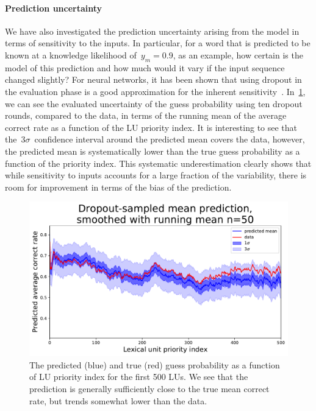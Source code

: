 \paragraph{Prediction uncertainty}
We have also investigated the prediction uncertainty arising from the model in terms of sensitivity to the inputs. In particular, for a word that is predicted to be known at a knowledge likelihood of~$y_m=0.9$, as an example, how certain is the model of this prediction and how much would it vary if the input sequence changed slightly? For neural networks, it has been shown that using dropout in the evaluation phase is a good approximation for the inherent sensitivity~\cite{gal2016dropout}. In~\cref{fig:uncertainty}, we can see the evaluated uncertainty of the guess probability using ten dropout rounds, compared to the data, in terms of the running mean of the average correct rate as a function of the LU priority index. It is interesting to see that the~$3\sigma$~confidence interval around the predicted mean covers the data, however, the predicted mean is systematically lower than the true guess probability as a function of the priority index. This systematic underestimation clearly shows that while sensitivity to inputs accounts for a large fraction of the variability, there is room for improvement in terms of the bias of the prediction.  

\begin{figure}[ht]
\centering
\includegraphics[width=1.0\linewidth]{figures/lingvist/uncertainty.pdf}
\caption[The sensitivity estimation of the model using dropout sampling]{The predicted (blue) and true (red) guess probability as a function of LU priority index for the first 500 LUs. We see that the prediction is generally sufficiently close to the true mean correct rate, but trends somewhat lower than the data.}
\label{fig:uncertainty}
\end{figure}

